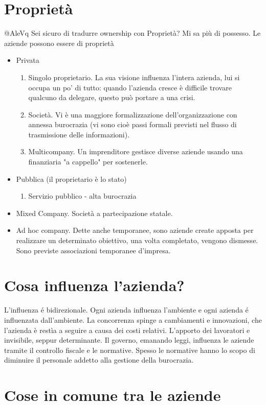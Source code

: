 \section{Propriet\`a}
@AleVq Sei sicuro di tradurre ownership con Proprietà? Mi sa più di possesso.
Le aziende possono essere di propriet\`a
\begin{itemize}
\item Privata
\begin{enumerate}
\item Singolo proprietario. La sua visione influenza l'intera azienda, lui si occupa un po' di tutto: quando l'azienda cresce \`e difficile trovare qualcuno da delegare, questo pu\`o portare a una crisi.
\item Societ\`a. Vi \`e una maggiore formalizzazione dell'organizzazione con annessa burocrazia (vi sono cio\`e passi formali previsti nel flusso di trasmissione delle informazioni).
\item Multicompany. Un imprenditore gestisce diverse aziende usando una finanziaria "a cappello" per sostenerle.
\end{enumerate}
\item Pubblica (il proprietario \`e lo stato)
\begin{enumerate}
	\item Servizio pubblico - alta burocrazia
\end{enumerate}
\item Mixed Company. Societ\`a a partecipazione statale.
\item Ad hoc company. Dette anche temporanee, sono aziende create apposta per realizzare un determinato obiettivo, una volta completato, vengono dismesse. Sono previste associazioni temporanee d'impresa.
\end{itemize}

\section{Cosa influenza l'azienda?}
L'influenza \'e bidirezionale. Ogni azienda influenza l'ambiente e ogni azienda \'e influenzata dall'ambiente.
La concorrenza spinge a cambiamenti e innovazioni, che l'azienda \`e rest\`ia a seguire a causa dei costi relativi.
L'apporto dei lavoratori e invisibile, seppur determinante.
Il governo, emanando leggi, influenza le aziende tramite il controllo fiscale e le normative. Spesso le normative hanno lo scopo di diminuire il personale addetto alla gestione della burocrazia.
\section{Cose in comune tra le aziende}
